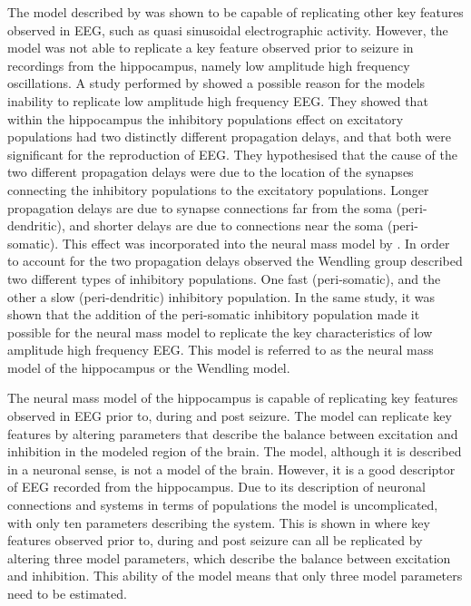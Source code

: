The model described by \cite{jansen1995electroencephalogram} was shown to be capable of replicating other key features observed in EEG, such as quasi sinusoidal electrographic activity. However, the model was not able to replicate a key feature observed prior to seizure in recordings from the hippocampus, namely low amplitude high frequency oscillations. A study performed by \cite{white2000networks} showed a possible reason for the models inability to replicate low amplitude high frequency EEG. They showed that within the hippocampus the inhibitory populations effect on excitatory populations had two distinctly different propagation delays, and that both were significant for the reproduction of EEG. They hypothesised that the cause of the two different propagation delays were due to the location of the synapses connecting the inhibitory populations to the excitatory populations. Longer propagation delays are due to synapse connections far from the soma (peri-dendritic), and shorter delays are due to connections near the soma (peri-somatic).  This effect was incorporated into the neural mass model by \cite{wendling2002epileptic}. In order to account for the two propagation delays observed the Wendling group described two different types of inhibitory populations. One fast (peri-somatic), and the other a slow (peri-dendritic) inhibitory population. In the same study, it was shown that the addition of the peri-somatic inhibitory population made it possible for the neural mass model to replicate the key characteristics of low amplitude high frequency EEG. This model is referred to as the neural mass model of the hippocampus or the Wendling model.


The neural mass model of the hippocampus is capable of replicating key features observed in EEG prior to, during and post seizure. The model can replicate key features by altering parameters that describe the balance between excitation and inhibition in the modeled region of the brain. The model, although it is described in a neuronal sense, is not a model of the brain. However, it is a good descriptor of EEG recorded from the hippocampus. Due to its description of neuronal connections and systems in terms of populations the model is uncomplicated, with only ten parameters describing the system. This is shown in \cite{wendling2002epileptic} where key features observed prior to, during and post seizure can all be replicated by altering three model parameters, which describe the balance between excitation and inhibition. This ability of the model means that only three model parameters need to be estimated.

